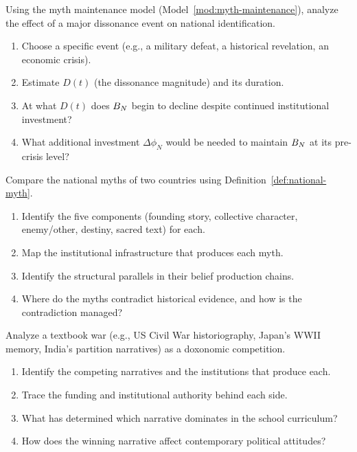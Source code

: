 \begin{exercise}
Using the myth maintenance model (Model~\ref{mod:myth-maintenance}), analyze the effect of a major dissonance event on national identification.
\begin{enumerate}[nosep]
  \item Choose a specific event (e.g., a military defeat, a historical revelation, an economic crisis).
  \item Estimate $D(t)$ (the dissonance magnitude) and its duration.
  \item At what $D(t)$ does $B_{N}$ begin to decline despite continued institutional investment?
  \item What additional investment $\Delta \phi_N$ would be needed to maintain $B_{N}$ at its pre-crisis level?
\end{enumerate}
\end{exercise}

\begin{exercise}
Compare the national myths of two countries using Definition~\ref{def:national-myth}.
\begin{enumerate}[nosep]
  \item Identify the five components (founding story, collective character, enemy/other, destiny, sacred text) for each.
  \item Map the institutional infrastructure that produces each myth.
  \item Identify the structural parallels in their belief production chains.
  \item Where do the myths contradict historical evidence, and how is the contradiction managed?
\end{enumerate}
\end{exercise}

\begin{exercise}
Analyze a textbook war (e.g., US Civil War historiography, Japan's WWII memory, India's partition narratives) as a doxonomic competition.
\begin{enumerate}[nosep]
  \item Identify the competing narratives and the institutions that produce each.
  \item Trace the funding and institutional authority behind each side.
  \item What has determined which narrative dominates in the school curriculum?
  \item How does the winning narrative affect contemporary political attitudes?
\end{enumerate}
\end{exercise}


